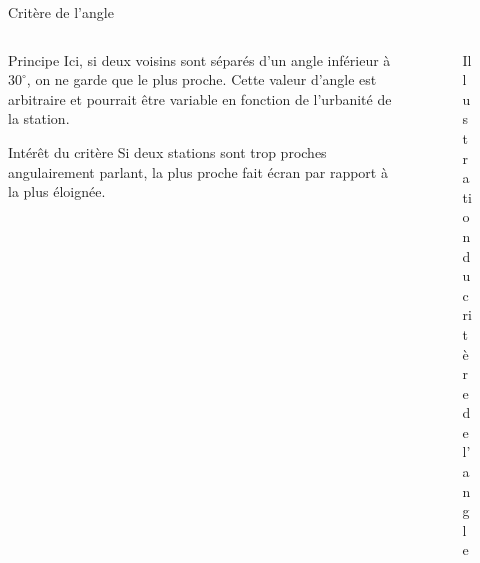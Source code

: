 \begin{frame}{Critère de l'angle}
    \begin{columns}
        \begin{column}{0.4\paperwidth}
            \begin{block}{Principe}
                Ici, si deux voisins sont séparés d'un angle inférieur à $30^{\circ}$, on ne garde que le plus proche. Cette valeur d'angle est arbitraire et pourrait être variable en fonction de l'urbanité de la station.
            \end{block}
            \begin{block}{Intérêt du critère}
                Si deux stations sont trop proches angulairement parlant, la plus proche fait écran par rapport à la plus éloignée.
            \end{block}
        \end{column}
        \begin{column}{0.55\paperwidth}
            \begin{figure}
                \caption{\label{fig:angle_crit}Illustration du critère de l'angle}
            \end{figure}
        \end{column}
    \end{columns}
\end{frame}

